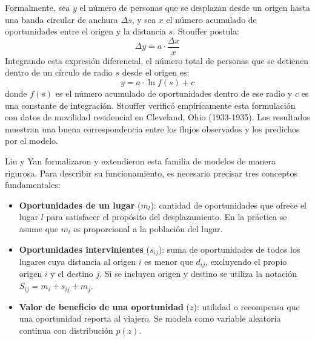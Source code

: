 Formalmente, sea $y$ el número de personas que se desplazan desde un origen hasta una banda circular de anchura $\Delta s$, y sea $x$ el número acumulado de oportunidades entre el origen y la distancia $s$. Stouffer postula:
\begin{equation}
    \Delta y = a \cdot \frac{\Delta x}{x}
    \label{eq:stouffer}
\end{equation}
Integrando esta expresión diferencial, el número total de personas que se detienen dentro de un círculo de radio $s$ desde el origen es:
\begin{equation}
    y = a \cdot \ln f(s) + c
    \label{eq:stouffer_integral}
\end{equation}
donde $f(s)$ es el número acumulado de oportunidades dentro de ese radio y $c$ es una constante de integración. Stouffer verificó empíricamente esta formulación con datos de movilidad residencial en Cleveland, Ohio (1933-1935). Los resultados muestran una buena correspondencia entre los flujos observados y los predichos por el modelo.

Liu y Yan \cite{liu2020intervening} formalizaron y extendieron esta familia de modelos de manera rigurosa. Para describir su funcionamiento, es necesario precisar tres conceptos fundamentales:

\begin{itemize}
    \item \textbf{Oportunidades de un lugar} ($m_l$): cantidad de oportunidades que ofrece el lugar $l$ para satisfacer el propósito del desplazamiento. En la práctica se asume que $m_l$ es proporcional a la población del lugar.
    \item \textbf{Oportunidades intervinientes} ($s_{ij}$): suma de oportunidades de todos los lugares cuya distancia al origen $i$ es menor que $d_{ij}$, excluyendo el propio origen $i$ y el destino $j$. Si se incluyen origen y destino se utiliza la notación $S_{ij} = m_i + s_{ij} + m_j$.
    \item \textbf{Valor de beneficio de una oportunidad} ($z$): utilidad o recompensa que una oportunidad reporta al viajero. Se modela como variable aleatoria continua con distribución $p(z)$.
\end{itemize}

